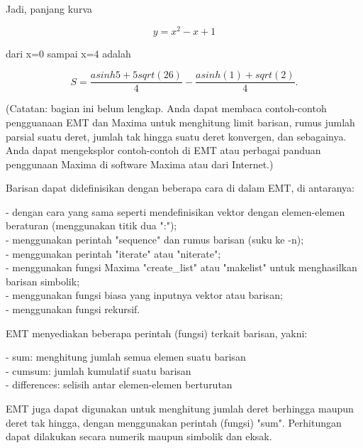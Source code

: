 \documentclass{article}
\begin{document}
\begin{eulernotebook}
\begin{eulercomment}
\begin{eulercomment}
\begin{eulercomment}
Jadi, panjang kurva\\
\end{eulercomment}
\begin{eulerformula}
\[
\text{$y=x^2-x+1$}
\]
\end{eulerformula}
\begin{eulercomment}
dari x=0 sampai x=4 adalah\\
\end{eulercomment}
\begin{eulerformula}
\[
\text{$S=\frac{asinh 5+5sqrt(26)}{4}-\frac{asinh(1)+sqrt(2)}{4}$}.
\]
\end{eulerformula}
\begin{eulercomment}
\begin{eulercomment}
\begin{eulercomment}
(Catatan: bagian ini belum lengkap. Anda dapat membaca contoh-contoh
pengguanaan EMT dan Maxima untuk menghitung limit barisan, rumus
jumlah parsial suatu deret, jumlah tak hingga suatu deret konvergen,
dan sebagainya. Anda dapat mengeksplor contoh-contoh di EMT atau
perbagai panduan penggunaan Maxima di software Maxima atau dari
Internet.)

Barisan dapat didefinisikan dengan beberapa cara di dalam EMT, di
antaranya:

- dengan cara yang sama seperti mendefinisikan vektor dengan
elemen-elemen beraturan (menggunakan titik dua ":");\\
- menggunakan perintah "sequence" dan rumus barisan (suku ke -n);\\
- menggunakan perintah "iterate" atau "niterate";\\
- menggunakan fungsi Maxima "create\_list" atau "makelist" untuk
menghasilkan barisan simbolik;\\
- menggunakan fungsi biasa yang inputnya vektor atau barisan;\\
- menggunakan fungsi rekursif.

EMT menyediakan beberapa perintah (fungsi) terkait barisan, yakni:

- sum: menghitung jumlah semua elemen suatu barisan\\
- cumsum: jumlah kumulatif suatu barisan\\
- differences: selisih antar elemen-elemen berturutan

EMT juga dapat digunakan untuk menghitung jumlah deret berhingga
maupun deret tak hingga, dengan menggunakan perintah (fungsi) "sum".
Perhitungan dapat dilakukan secara numerik maupun simbolik dan eksak.


\end{eulercomment}
\end{eulercomment}
\end{eulercomment}
\end{eulercomment}
\end{eulercomment}
\end{eulernotebook}
\end{document}
